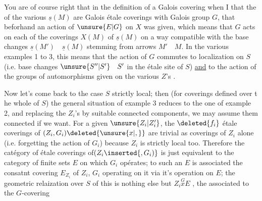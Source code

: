 You are of course right that in the definition of a Galois covering when I  that the  of the various $\underline{s}(M)$ are Galois étale coverings with Galois group $G$, that beforhand an action of $\unsure{E|G}$ on $X$ was given, which means that $G$ acts on each of the coverings $X(M)$ of $\underline{s}(M)$ on a way compatible with the base changes $\underline{s}(M')\quad\underline{s}(M)$ stemming from arrows  $M'\quad M$. In the various examples 1 to 3, this means that the action of $G$ commutes to  localization on $S$ (i.e. base changes $\unsure{S''|S'}\quad S'$ in the étale site of $S$) \uline{and} to the action of the groups of automorphisms given on the various $Z$'s .

Now let's come back to the case $S$ strictly local; then (for coverings defined over t he whole of $S$) the general situation of example 3 reduces to the one of example 2, and replacing the $Z_i$'s by suitable connected components, we may assume them connected if we want. For a given $\unsure{Z_i|Z_i'}$, the $\deleted{f_i}$ étale coverings of $(Z_i,G_i)\deleted{\unsure{x|,}}$ are trivial as coverings of $Z_i$ alone (i.e. forgetting the action of $G_i$) because $Z_i$ is strictly local too. Therefore the catégory of étale coverings of$(Z_i\inserted{,G_i)}$ is just equivalent to the category of finite sets $E$ on which $G_i$ opérates; to such an $E$ is associated the consatnt covering $E_{Z_i}$ of $Z_i$,  $G_i$ operating on it via it's operation on $E$; the geometric relaization over $S$ of this is nothing else but $Z_i\overset{G}{x}E$ , the  associated to the $G$-covering

